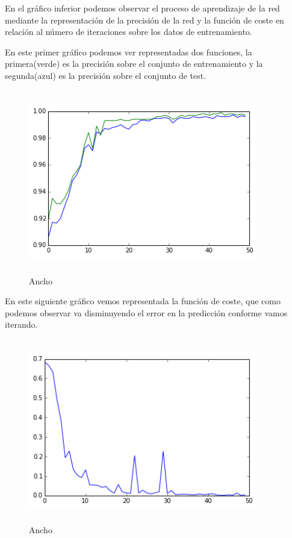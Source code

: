 \documentclass{article}
\begin{document}
En el gráfico inferior podemos observar el proceso de aprendizaje de la red mediante la representación de la precisión de la red y la función de coste en relación al número de iteraciones sobre los datos de entrenamiento.

En este primer gráfico podemos ver representadas dos funciones, la primera(verde) es la precisión sobre el conjunto de entrenamiento y la segunda(azul) es la precisión sobre el conjunto de test.

\begin{figure}[H]
  \centering
  \includegraphics[width=100mm, height=80mm]{images/accuracy.png}
  \caption{Ancho}
\end{figure}

En este siguiente gráfico vemos representada la función de coste, que como podemos observar va disminuyendo el error en la predicción conforme vamos iterando.

\begin{figure}[H]
  \centering
  \includegraphics[width=100mm, height=80mm]{images/loss_function.png}
  \caption{Ancho}
\end{figure}
\end{document}
